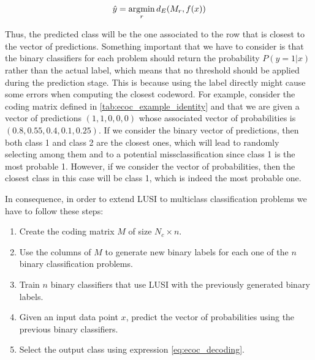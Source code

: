 \begin{equation}
    \label{eq:ecoc_decoding}
    \hat{y} = \operatorname*{\arg\!\min}_r d_E(M_r, f(x))
\end{equation}

Thus, the predicted class will be the one associated to the row that is closest to the vector of predictions.
Something important that we have to consider is that the binary classifiers for each problem should return the
probability $P(y=1 | x)$ rather than the actual label, which means that no threshold should be applied
during the prediction stage. This is because using the label directly might cause some errors when computing
the closest codeword. For example, consider the coding matrix defined in \ref{tab:ecoc_example_identity} and that
we are given a vector of predictions $(1, 1, 0, 0, 0)$ whose associated vector of probabilities is
$(0.8, 0.55, 0.4, 0.1, 0.25)$. If we consider the binary vector of predictions, then both class 1 and
class 2 are the closest ones, which will lead to randomly selecting among them and to a potential missclassification
since class 1 is the most probable 1. However, if we consider the vector of probabilities, then the closest
class in this case will be class 1, which is indeed the most probable one.

In consequence, in order to extend LUSI to multiclass classification problems we have to follow these steps:

\begin{enumerate}[label=\textbf{Step \arabic*:}]
    \item Create the coding matrix $M$ of size $N_c \times n$.
    \item Use the columns of $M$ to generate new binary labels for each one of the $n$ binary classification problems.
    \item Train $n$ binary classifiers that use LUSI with the previously generated binary labels.
    \item Given an input data point $x$, predict the vector of probabilities using the previous binary classifiers.
    \item Select the output class using expression \eqref{eq:ecoc_decoding}.
\end{enumerate}
